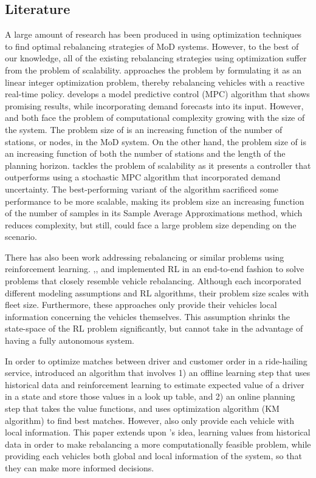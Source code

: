 \documentclass[letterpaper, 10 pt, conference]{ieeeconf}  %
\begin{document}
\subsection{Literature}
A large amount of research has been produced in using optimization techniques to find optimal rebalancing strategies of MoD systems. However, to the best of our knowledge, all of the existing rebalancing strategies using optimization suffer from the problem of scalability. \cite{Zhang.ea:Reactive} approaches the problem by formulating it as an linear integer optimization problem, thereby rebalancing vehicles with a reactive real-time policy. \cite{Iglesias.ea:MPC} develops a model predictive control (MPC) algorithm that shows promising results, while incorporating demand forecasts into its input. However, \cite{Zhang.ea:Reactive} and \cite{Iglesias.ea:MPC} both face the problem of computational complexity growing with the size of the system. The problem size of \cite{Zhang.ea:Reactive} is an increasing function of the number of stations, or nodes, in the MoD system. On the other hand, the problem size of \cite{Iglesias.ea:MPC} is an increasing function of both the number of stations and the length of the planning horizon.
\cite{Tsao.ea:Stochastic} tackles the problem of scalability as it presents a controller that outperforms \cite{Iglesias.ea:MPC} using a stochastic MPC algorithm that incorporated demand uncertainty. The best-performing variant of the algorithm sacrificed some performance to be more scalable, making its problem size an increasing function of the number of samples in its Sample Average Approximations method, which reduces complexity, but still, could face a large problem size depending on the scenario. 

There has also been work addressing rebalancing or similar problems using reinforcement learning. \cite{Rahili.ea:Caltech},\cite{Gueriau.ea:Decentralized},\cite{Wen.ea:SharedMoDRL} and \cite{Lin.ea:DidiFleetManagement} implemented RL in an end-to-end fashion to solve problems that closely resemble vehicle rebalancing. Although each incorporated different modeling assumptions and RL algorithms, their problem size scales with fleet size. Furthermore, these approaches only provide their vehicles local information concerning the vehicles themselves. This assumption shrinks the state-space of the RL problem significantly, but cannot take in the advantage of having a fully autonomous system.

In order to optimize matches between driver and customer order in a ride-hailing service, \cite{Xu.ea:DidiDispatch} introduced an algorithm that involves 1) an offline learning step that uses historical data and reinforcement learning to estimate expected value of a driver in a state and store those values in a look up table, and 2) an online planning step that takes the value functions, and uses optimization algorithm (KM algorithm) to find best matches. However, \cite{Xu.ea:DidiDispatch} also only provide each vehicle with local information. This paper extends upon \cite{Xu.ea:DidiDispatch}'s idea, learning values from historical data in order to make rebalancing a more computationally feasible problem, while providing each vehicles both global and local information of the system, so that they can make more informed decisions.
\end{document}
